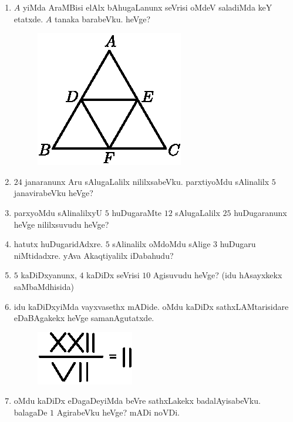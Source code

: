 \begin{enumerate}
\item $A$ yiMda AraMBisi elAlx bAhugaLanunx seVrisi oMdeV saladiMda keY etatxde. $A$ tanaka barabeVku. heVge?
\begin{figure}[H]
\centering
\includegraphics{src/figures/exr34.eps}
\end{figure}

\item $24$ janaranunx Aru sAlugaLalilx nililxsabeVku. parxtiyoMdu sAlinalilx $5$ janavirabeVku heVge?

\item parxyoMdu sAlinalilxyU $5$ huDugaraMte $12$ sAlugaLalilx $25$ huDuga\-ranunx heVge nililxsuvudu heVge?

\item hatutx huDugaridAdxre. $5$ sAlinalilx oMdoMdu sAlige $3$ huDugaru niMtidadxre. yAva Akaqtiyalilx iDabahudu?

\item $5$ kaDiDxyanunx, $4$ kaDiDx seVrisi $10$ Agisuvudu heVge? (idu hAsayxkekx saMbaMdhisida)

\item idu kaDiDxyiMda vayxvasethx mADide. oMdu kaDiDx sathxLAMtarisidare eDaBAgakekx heVge samanAgutatxde.
\begin{figure}[H]
\centering
\includegraphics{src/figures/exer39.eps}
\end{figure}

\item oMdu kaDiDx eDagaDeyiMda beVre sathxLakekx badalAyisabeVku. balagaDe $1$ AgirabeVku heVge? mADi noVDi.

\eject



\end{enumerate}
